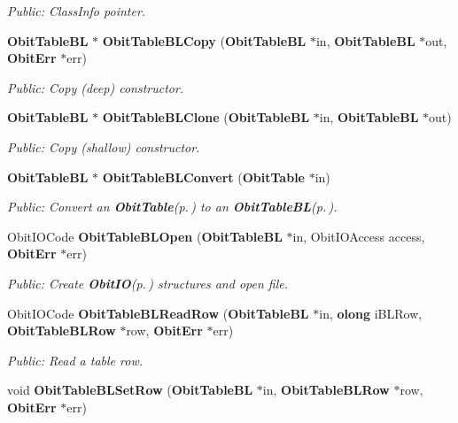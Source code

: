 \begin{CompactItemize}
\begin{CompactList}\small\item\em Public: Class\-Info pointer. \item\end{CompactList}\item 
{\bf Obit\-Table\-BL} $\ast$ {\bf Obit\-Table\-BLCopy} ({\bf Obit\-Table\-BL} $\ast$in, {\bf Obit\-Table\-BL} $\ast$out, {\bf Obit\-Err} $\ast$err)
\begin{CompactList}\small\item\em Public: Copy (deep) constructor. \item\end{CompactList}\item 
{\bf Obit\-Table\-BL} $\ast$ {\bf Obit\-Table\-BLClone} ({\bf Obit\-Table\-BL} $\ast$in, {\bf Obit\-Table\-BL} $\ast$out)
\begin{CompactList}\small\item\em Public: Copy (shallow) constructor. \item\end{CompactList}\item 
{\bf Obit\-Table\-BL} $\ast$ {\bf Obit\-Table\-BLConvert} ({\bf Obit\-Table} $\ast$in)
\begin{CompactList}\small\item\em Public: Convert an {\bf Obit\-Table}{\rm (p.\,\pageref{structObitTable})} to an {\bf Obit\-Table\-BL}{\rm (p.\,\pageref{structObitTableBL})}. \item\end{CompactList}\item 
Obit\-IOCode {\bf Obit\-Table\-BLOpen} ({\bf Obit\-Table\-BL} $\ast$in, Obit\-IOAccess access, {\bf Obit\-Err} $\ast$err)
\begin{CompactList}\small\item\em Public: Create {\bf Obit\-IO}{\rm (p.\,\pageref{structObitIO})} structures and open file. \item\end{CompactList}\item 
Obit\-IOCode {\bf Obit\-Table\-BLRead\-Row} ({\bf Obit\-Table\-BL} $\ast$in, {\bf olong} i\-BLRow, {\bf Obit\-Table\-BLRow} $\ast$row, {\bf Obit\-Err} $\ast$err)
\begin{CompactList}\small\item\em Public: Read a table row. \item\end{CompactList}\item 
void {\bf Obit\-Table\-BLSet\-Row} ({\bf Obit\-Table\-BL} $\ast$in, {\bf Obit\-Table\-BLRow} $\ast$row, {\bf Obit\-Err} $\ast$err)

\end{CompactItemize}
